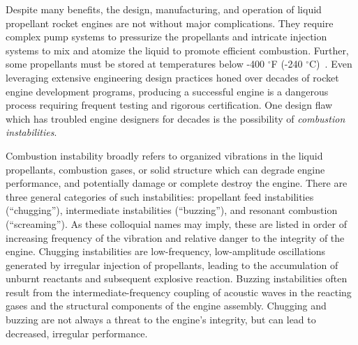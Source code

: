 Despite many benefits, the design, manufacturing, and operation of liquid propellant rocket engines are not without major complications. They require complex pump systems to pressurize the propellants and intricate injection systems to mix and atomize the liquid to promote efficient combustion. Further, some propellants must be stored at temperatures below -400 $^{\circ}$F (-240 $^{\circ}$C)~\cite{liquidHydrogenProps}. Even leveraging extensive engineering design practices honed over decades of rocket engine development programs, producing a successful engine is a dangerous process requiring frequent testing and rigorous certification. One design flaw which has troubled engine designers for decades is the possibility of \textit{combustion instabilities}.

Combustion instability broadly refers to organized vibrations in the liquid propellants, combustion gases, or solid structure which can degrade engine performance, and potentially damage or complete destroy the engine. There are three general categories of such instabilities: propellant feed instabilities (``chugging''), intermediate instabilities (``buzzing''), and resonant combustion (``screaming''). As these colloquial names may imply, these are listed in order of increasing frequency of the vibration and relative danger to the integrity of the engine. Chugging instabilities are low-frequency, low-amplitude oscillations generated by irregular injection of propellants, leading to the accumulation of unburnt reactants and subsequent explosive reaction. Buzzing instabilities often result from the intermediate-frequency coupling of acoustic waves in the reacting gases and the structural components of the engine assembly. Chugging and buzzing are not always a threat to the engine's integrity, but can lead to decreased, irregular performance.

